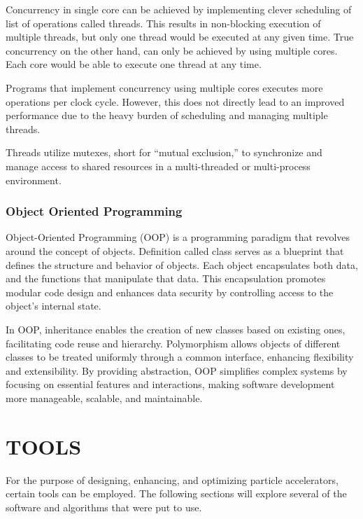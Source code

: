 \documentclass[a4paper,oneside,12pt]{report}
\numberwithin{equation}{chapter}
\begin{document}
\vspace{-5pt}
Concurrency in single core can be achieved by implementing clever scheduling of list of operations called threads. This results in non-blocking execution of multiple threads, but only one thread would be executed at any given time. 
True concurrency on the other hand, can only be achieved by using multiple cores. Each core would be able to execute one thread at any time.

Programs that implement concurrency using multiple cores executes more operations per clock cycle. 
However, this does not directly lead to an improved performance due to the heavy burden of scheduling and managing multiple threads.

Threads utilize mutexes, short for ``mutual exclusion,''
to synchronize and manage access to shared resources 
in a multi-threaded or multi-process environment. 

\subsection{Object Oriented Programming}

Object-Oriented Programming (OOP) is a programming paradigm that revolves around the concept of objects. 
Definition called class serves as a blueprint that defines the structure and behavior of objects. 
Each object encapsulates both data, and the functions that manipulate that data. 
This encapsulation promotes modular code design and enhances data security by controlling access to the object's internal state. 

In OOP, inheritance enables the creation of new classes based on existing ones, facilitating code reuse and hierarchy. 
Polymorphism allows objects of different classes to be treated uniformly through a common interface, enhancing flexibility and extensibility. 
By providing abstraction, OOP simplifies complex systems by focusing on essential features and interactions, making software development more manageable, scalable, and maintainable.



\newpage


\chapter{TOOLS}

For the purpose of designing, enhancing, and optimizing particle accelerators, certain tools can be employed. 
The following sections will explore several of the software and algorithms that were put to use.
\end{document}

